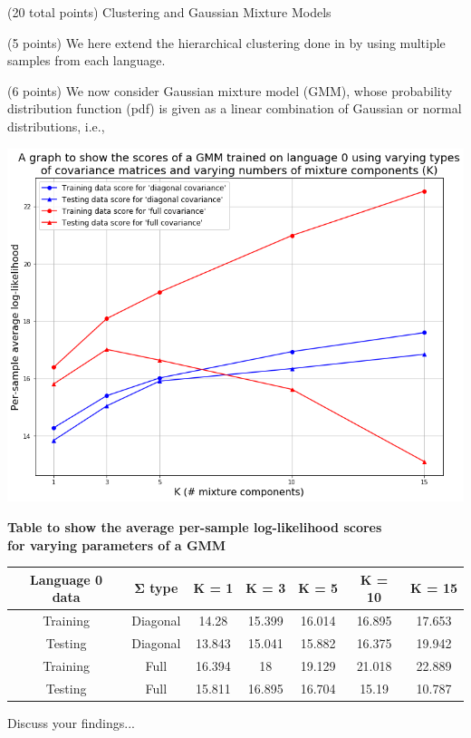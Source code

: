 \documentclass[12pt]{article}
\begin{document}
\begin{question}{(20 total points) Clustering and Gaussian Mixture Models}
\begin{subquestion}{(5 points)
       We here extend the hierarchical clustering done in  by
       using multiple samples from each language.
     }
   \end{subquestion}
   \begin{subquestion}{(6 points)
       We now consider Gaussian mixture model (GMM), whose
       probability distribution function (pdf) is given as
       a linear combination of Gaussian or normal distributions, i.e.,
     } \label{Q3.5}




      \begin{answerbox}{50em}
         \includegraphics[width=1\textwidth]{images/q35.png}
        \footnotesize{
        \begin{center}
        \textbf{Table to show the average per-sample log-likelihood scores} \\
        \textbf{for varying parameters of a GMM} \\
        \vspace{0.3cm}
        \begin{tabular}{ |c|c|c|c|c|c|c| } \hline
        \textbf{Language 0 data} & \textbf{$\mathbf{\Sigma}$ type} & \textbf{K = 1} & \textbf{K = 3} & \textbf{K = 5} & \textbf{K = 10} & \textbf{K = 15} \\ \hline
        Training & Diagonal & 14.28 & 15.399 & 16.014 & 16.895 & 17.653 \\
        Testing & Diagonal & 13.843 & 15.041 & 15.882 & 16.375 & 19.942 \\
        Training & Full & 16.394 & 18 & 19.129 & 21.018 & 22.889 \\
        Testing & Full & 15.811 & 16.895 & 16.704 & 15.19 & 10.787 \\ \hline
        \end{tabular}
        \end{center}
        Discuss your findings...
        }
      \end{answerbox}
  



\end{subquestion}
\end{question}
\end{document}
